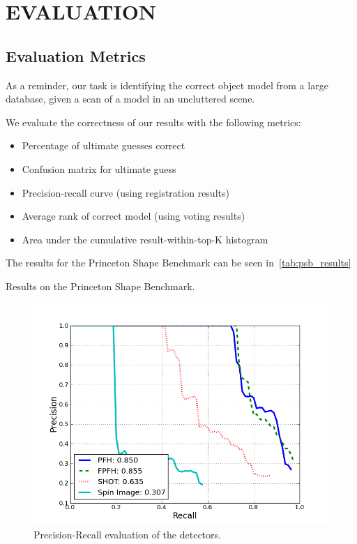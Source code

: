 \section{EVALUATION}

\subsection{Evaluation Metrics}
As a reminder, our task is identifying the correct object model from a large database, given a scan of a model in an uncluttered scene.

We evaluate the correctness of our results with the following metrics:
\begin{itemize}
  \item Percentage of ultimate guesses correct
  \item Confusion matrix for ultimate guess
  \item Precision-recall curve (using registration results)
  \item Average rank of correct model (using voting results)
  \item Area under the cumulative result-within-top-K histogram
\end{itemize}

The results for the Princeton Shape Benchmark can be seen in~\ref{tab:psb_results}
\begin{table}
  \centering
  
  \caption{Results on the Princeton Shape Benchmark.}
  \label{tab:psb_results}
\end{table}

\begin{figure}[thpb]
\centering
\includegraphics[width=1\linewidth]{../figures/PSB/PFH-FPFH-SHOT-SPIN_IMAGE_pr.png}
\caption{Precision-Recall evaluation of the detectors.}
\label{fig:pr}
\end{figure}

